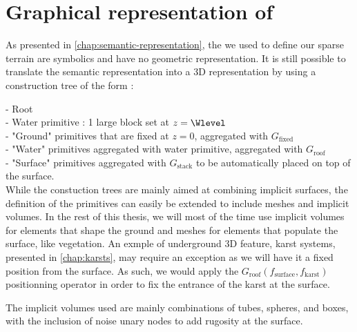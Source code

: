 \section{Graphical representation of }
\label{sec:volumic-modeling_graphic-representation-env-objects}

As presented in \cref{chap:semantic-representation}, the  we used to define our sparse terrain are symbolics and have no geometric representation. It is still possible to translate the semantic representation into a 3D representation by using a construction tree of the form :

- Root \\
- Water primitive : 1 large block set at $z = \Wlevel$ \\
- "Ground" primitives that are fixed at $z = 0$, aggregated with $G_\text{fixed}$ \\
- "Water" primitives aggregated with water primitive, aggregated with $G_\text{roof}$ \\
- "Surface" primitives aggregated with $G_\text{stack}$ to be automatically placed on top of the surface. \\

While the constuction trees are mainly aimed at combining implicit surfaces, the definition of the primitives can easily be extended to include meshes and implicit volumes. In the rest of this thesis, we will most of the time use implicit volumes for elements that shape the ground and meshes for elements that populate the surface, like vegetation. An exmple of underground 3D feature, karst systems, presented in \cref{chap:karsts}, may require an exception as we will have it a fixed position from the surface. As such, we would apply the $G_\text{roof}(f_\text{surface}, f_\text{karst})$ positionning operator in order to fix the entrance of the karst at the surface.

The implicit volumes used are mainly combinations of tubes, spheres, and boxes, with the inclusion of noise unary nodes to add rugosity at the surface.